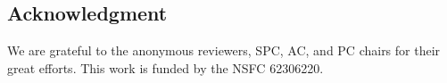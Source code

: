 \documentclass[letterpaper]{article} %
\begin{document}
\subsection{Acknowledgment}
We are grateful to the anonymous reviewers, SPC, AC, and PC chairs for their great efforts. This work is funded by the NSFC 62306220.



\end{document}

